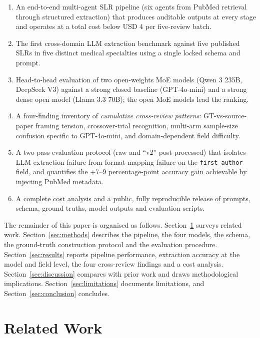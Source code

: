 \documentclass[a4paper,fleqn]{cas-sc}
\begin{document}
\begin{enumerate}
\item An end-to-end multi-agent SLR pipeline (six agents from PubMed retrieval
through structured extraction) that produces auditable outputs at every
stage and operates at a total cost below USD 4 per five-review batch.
\item The first cross-domain LLM extraction benchmark against five published
SLRs in five distinct medical specialties using a single locked schema and
prompt.
\item Head-to-head evaluation of two open-weights MoE models (Qwen 3 235B,
DeepSeek V3) against a strong closed baseline (GPT-4o-mini) and a strong
dense open model (Llama 3.3 70B); the open MoE models lead the ranking.
\item A four-finding inventory of \emph{cumulative cross-review patterns}:
GT-vs-source-paper framing tension, crossover-trial recognition, multi-arm
sample-size confusion specific to GPT-4o-mini, and domain-dependent field
difficulty.
\item A two-pass evaluation protocol (raw and ``v2'' post-processed) that
isolates LLM extraction failure from format-mapping failure on the
\texttt{first\_author} field, and quantifies the +7--9 percentage-point
accuracy gain achievable by injecting PubMed metadata.
\item A complete cost analysis and a public, fully reproducible release of
prompts, schema, ground truths, model outputs and evaluation scripts.
\end{enumerate}

The remainder of this paper is organised as follows. Section~\ref{sec:related}
surveys related work. Section~\ref{sec:methods} describes the pipeline,
the four models, the schema, the ground-truth construction protocol and
the evaluation procedure. Section~\ref{sec:results} reports
pipeline performance, extraction accuracy at the model and field level,
the four cross-review findings and a cost analysis.
Section~\ref{sec:discussion} compares with prior work and draws
methodological implications. Section~\ref{sec:limitations} documents
limitations, and Section~\ref{sec:conclusion} concludes.

\section{Related Work}\label{sec:related}
\end{document}
